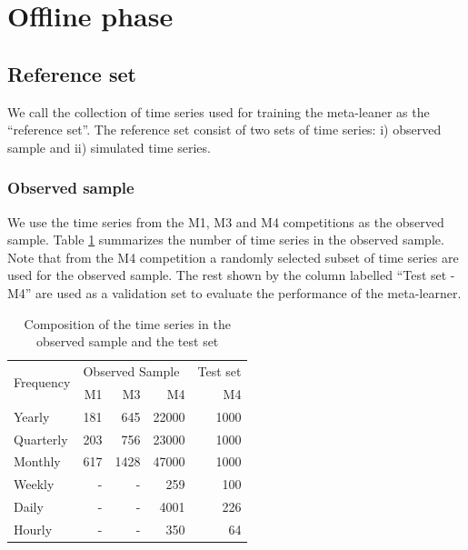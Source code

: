 \documentclass[11pt,a4paper,]{article}
\begin{document}
\hypertarget{offline}{%
\section{Offline phase}\label{offline}}

\hypertarget{reference-set}{%
\subsection{Reference set}\label{reference-set}}

We call the collection of time series used for training the meta-leaner as the ``reference set''. The reference set consist of two sets of time series: i) observed sample and ii) simulated time series.

\hypertarget{observed-sample}{%
\subsubsection{Observed sample}\label{observed-sample}}

We use the time series from the M1, M3 and M4 competitions as the observed sample. Table \ref{observedsample} summarizes the number of time series in the observed sample. Note that from the M4 competition a randomly selected subset of time series are used for the observed sample. The rest shown by the column labelled ``Test set - M4'' are used as a validation set to evaluate the performance of the meta-learner.

\begin{table}[!h]
\centering
\caption{Composition of the time series in the observed sample and the test set}
\label{observedsample}
\begin{tabular}{l|rrr|r}
\multirow{2}{*}{Frequency} & \multicolumn{3}{l|}{Observed Sample} & Test set \\
&   M1    &    M3   &    M4 & M4 \\ \hline
Yearly          &   181    &   645    &   22000 & 1000 \\
Quarterly       &   203    &    756   &   23000 & 1000\\
Monthly         &   617    &    1428   &  47000 & 1000\\
Weekly          &   -    &   -    &   259 & 100\\
Daily           &   -    &   -    &   4001 & 226\\
Hourly          &   -    &    -   &  350 & 64\\ \hline
\end{tabular}
\end{table}
\end{document}
